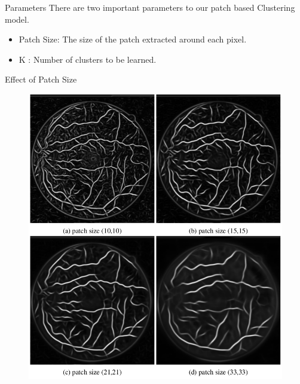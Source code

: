 \documentclass{beamer}
\begin{document}
	\begin{frame}{Parameters}
		There are two important parameters to our patch based Clustering model.
		\begin{itemize}
			\item Patch Size: The size of the patch extracted around each pixel.
			\item K : Number of clusters to be learned.
		\end{itemize}
	\end{frame}
	\begin{frame}{Effect of Patch Size}
		\begin{figure}
			\includegraphics[width=.55\textwidth]{framework/patchsize}

		\end{figure}
	\end{frame}
\end{document}

